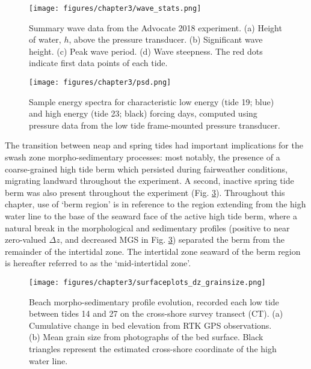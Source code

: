 \begin{figure}[tbp] %
	\texttt{[image: figures/chapter3/wave\_stats.png]}
	\caption[Wave data: Advocate 2018 experiment]{Summary wave data from the Advocate 2018 experiment. (a) Height of water, $h$, above the pressure transducer. (b) Significant wave height. (c) Peak wave period. (d) Wave steepness. The red dots indicate first data points of each tide.} %
	\label{fig:wavestats}
\end{figure}

\begin{figure}[tbp] %
	\begin{center}
	\texttt{[image: figures/chapter3/psd.png]}
	\caption[Energy spectra for high and low energy wave forcing]{Sample energy spectra for characteristic low energy (tide 19; blue) and high energy (tide 23; black) forcing days, computed using pressure data from the low tide frame-mounted pressure transducer.}
	\label{fig:psd}
	\end{center}
\end{figure}

The transition between neap and spring tides had important implications for the swash zone morpho-sedimentary processes: most notably, the presence of a coarse-grained high tide berm which persisted during fairweather conditions, migrating landward throughout the experiment. A second, inactive spring tide berm was also present throughout the experiment (Fig. \ref{fig:alltides_profiles}). Throughout this chapter, use of `berm region' is in reference to the region extending from the high water line to the base of the seaward face of the active high tide berm, where a natural break in the morphological and sedimentary profiles (positive to near zero-valued $\Delta z$, and decreased MGS in Fig. \ref{fig:alltides_profiles}) separated the berm from the remainder of the intertidal zone. The intertidal zone seaward of the berm region is hereafter referred to as the `mid-intertidal zone'.

\begin{figure}[tbp] %
  	\texttt{[image: figures/chapter3/surfaceplots\_dz\_grainsize.png]}
 	\caption[Surface plots of bed level change and mean grain size by tide]{Beach morpho-sedimentary profile evolution, recorded each low tide between tides 14 and 27 on the cross-shore survey transect (CT). (a) Cumulative change in bed elevation from RTK GPS observations. (b) Mean grain size from photographs of the bed surface. Black triangles represent the estimated cross-shore coordinate of the high water line.}
 	\label{fig:alltides_profiles}
\end{figure}

